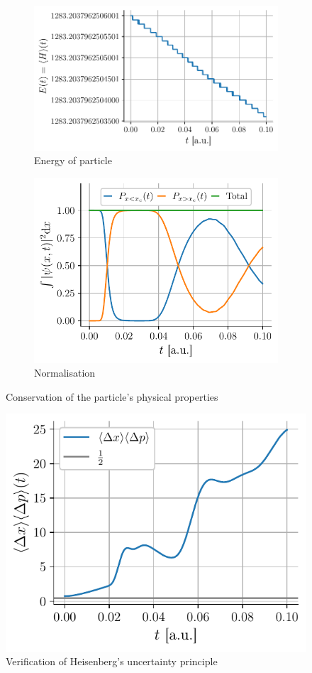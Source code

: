 \begin{figure}[h]
    \centering
    \begin{subfigure}{0.55\linewidth}
        \centering
        \includegraphics[width=\linewidth]{figures/i_conservation_energy.pdf}
        \caption{Energy of particle}
        \label{fig:i_conservation_energy}
    \end{subfigure}
    \begin{subfigure}{0.44\linewidth}
        \centering
        \includegraphics[width=\linewidth]{figures/i_conservation_probability.pdf}
        \caption{Normalisation}
        \label{fig:i_conservation_probability}
    \end{subfigure}
    \caption{Conservation of the particle's physical properties}
    \label{fig:i_conservation}
\end{figure}

\begin{figure}[h]
    \centering
    \includegraphics[width=0.6\linewidth]{figures/i_heisenberg.pdf}
    \caption{Verification of Heisenberg's uncertainty principle}
    \label{fig:i_heisenberg}
\end{figure}